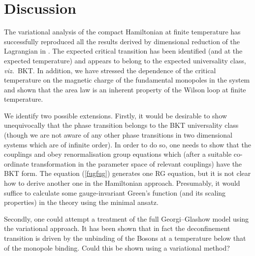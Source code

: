 \documentclass[a4paper,a4paper]{article}
\begin{document}
%
\section{Discussion}
The variational analysis of the compact \coordHE{} Hamiltonian at finite temperature has successfully reproduced
all the results derived by dimensional reduction of the Lagrangian in \cite{Agasian:1998wv}. The expected critical transition has
been identified (and at the expected temperature) and appears to belong to the expected universality class, \emph{viz.\ }BKT.
In addition, we have stressed the dependence of the critical temperature on the magnetic charge \coordHE{} of the fundamental monopoles
in the system and shown that the area law is an inherent property of the Wilson loop at finite temperature.

We identify two possible extensions. Firstly, it would be desirable to show unequivocally that the phase transition belongs to the BKT
universality class (though we are not aware of any other phase transitions in two dimensional systems which are of infinite order).
In order to do so, one needs to show that the couplings \coordHE{} and \coordHE{} obey renormalisation group equations which 
(after a suitable co-ordinate transformation in the parameter space of relevant couplings) have the BKT form. The equation (\ref{fugfug})
generates one RG equation, but it is not clear how to derive another one in the Hamiltonian approach. Presumably, it would
suffice to calculate some gauge-invariant Green's function (and its scaling properties) in the theory using the minimal ansatz. 

Secondly, one could attempt a treatment of the full Georgi--Glashow model using the variational approach. 
It has been shown \cite{Dunne:2000vp} 
that in fact the deconfinement transition is driven by the unbinding of the \coordHE{} Bosons at a temperature
below that of the monopole binding. Could this be shown using a variational method?
\end{document}
